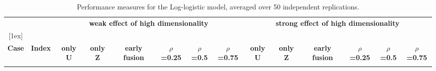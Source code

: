 \begin{table}[!htbp]
\centering
\tiny
\caption{Performance measures for the Log-logistic model, averaged over 50 independent replications.}
\label{tab:TableS2}
\begin{tabular}{c|c|cccccc|cccccc}

\multicolumn{1}{c}{} &
\multicolumn{1}{c}{} &
\multicolumn{6}{c}{\bf weak effect of high dimensionality} &
\multicolumn{6}{c}{\bf strong effect of high dimensionality} \\

[1ex]
\hline

& & & & & & & & & & & & & \\

{\bf Case} &
{\bf Index} &
{\bf only U} &
{\bf only Z} &
{\bf early fusion} &
{\bf $\rho$=0.25} &
{\bf $\rho$=0.5} &
{\bf $\rho$=0.75} &
{\bf only U} &
{\bf only Z} &
{\bf early fusion} &
{\bf $\rho$=0.25} &
{\bf $\rho$=0.5} &
{\bf $\rho$=0.75} \\

& & & & & & & & & & & & & \\


\end{tabular}
\end{table}
